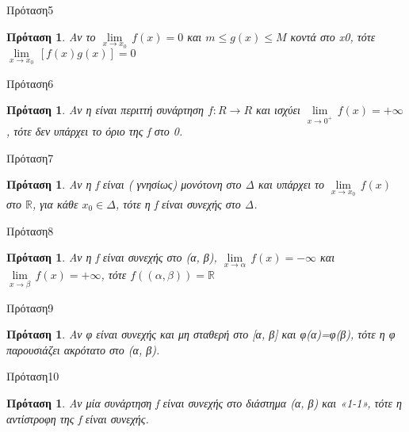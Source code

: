 \documentclass[greek]{beamer}
\newtheorem{proposition}[theorem]{Πρόταση}
\begin{document}
\begin{frame}{Πρόταση5}
 \begin{proposition}
  \normalfont Aν το $\underset{x\to {{x}_{0}}}{\mathop{\lim }}\,f(x)=0$ και $m\le g(x)\le M$ κοντά στο x0, τότε $\underset{x\to {{x}_{0}}}{\mathop{\lim }}\,[f(x)g(x)]=0$
 \end{proposition}
\end{frame}

\begin{frame}{Πρόταση6}
 \begin{proposition}
  \normalfont Αν η είναι περιττή συνάρτηση $f:R\to R$ και ισχύει $\underset{x\to {{0}^{+}}}{\mathop{\lim }}\,f(x)=+\infty $, τότε δεν υπάρχει το όριο της f στο 0.
 \end{proposition}


\end{frame}
\begin{frame}{Πρόταση7}
 \begin{proposition}
  \normalfont Aν η f είναι ( γνησίως) μονότονη στο Δ και υπάρχει το $\underset{x\to {{x}_{0}}}{\mathop{\lim }}\,f(x)$ στο $\mathbb{R}$, για κάθε $x_0 \in \Delta $, τότε η f είναι συνεχής στο Δ.
 \end{proposition}
\end{frame}

\begin{frame}{Πρόταση8}
 \begin{proposition}
  \normalfont Αν η f είναι συνεχής στο (α, β), $\underset{x\to \alpha }{\mathop{\lim }}\,f(x)=-\infty $ και $\underset{x\to \beta }{\mathop{\lim }}\,f(x)=+\infty $, τότε $f\left( (\alpha ,\beta ) \right)=\mathbb{R}$
 \end{proposition}
\end{frame}

\begin{frame}{Πρόταση9}
 \begin{proposition}
  \normalfont Αν φ είναι συνεχής και μη σταθερή στο [α, β] και φ(α)=φ(β), τότε η φ παρουσιάζει ακρότατο στο (α, β).
 \end{proposition}
\end{frame}

\begin{frame}{Πρόταση10}
 \begin{proposition}
  \normalfont Αν μία συνάρτηση f είναι συνεχής στο διάστημα (α, β) και «1-1», τότε η αντίστροφη της f είναι συνεχής.
 \end{proposition}
\end{frame}
\end{document}
